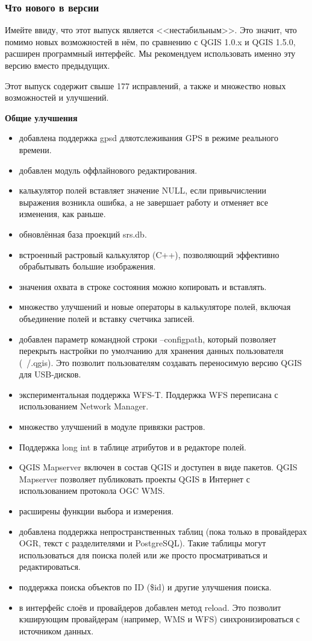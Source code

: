 \subsubsection{Что нового в версии \CURRENT}

Имейте ввиду, что этот выпуск является <<нестабильным>>. Это значит, что
помимо новых возможностей в нём, по сравнению с QGIS 1.0.x и QGIS 1.5.0,
расширен программный интерфейс. Мы рекомендуем использовать именно эту
версию вместо предыдущих.

Этот выпуск содержит свыше 177 исправлений, а также и множество новых
возможностей и улучшений.

\textbf{Общие улучшения}

\begin{itemize}[label=--]
\item добавлена поддержка gpsd дляотслеживания GPS в режиме реального времени.
\item добавлен модуль оффлайнового редактирования.
\item калькулятор полей вставляет значение NULL, если привычислении выражения
возникла ошибка, а не завершает работу и отменяет все изменения, как раньше.
\item обновлённая база проекций srs.db.
\item встроенный растровый калькулятор (C++), позволяющий эффективно обрабытывать
большие изображения.
\item значения охвата в строке состояния можно копировать и вставлять.
\item множество улучшений и новые операторы в калькуляторе полей, включая
объединение полей и вставку счетчика записей.
\item добавлен параметр командной строки --configpath, который позволяет
перекрыть настройки по умолчанию для хранения данных пользователя (~/.qgis).
Это позволит пользователям создавать переносимую версию QGIS для USB-дисков.
\item экспериментальная поддержка WFS-T. Поддержка WFS переписана с
использованием Network Manager.
\item множество улучшений в модуле привязки растров.
\item Поддержка long int в таблице атрибутов и в редакторе полей.
\item QGIS Mapserver включен в состав QGIS и доступен в виде пакетов.
QGIS Mapserver позволяет публиковать проекты QGIS в Интернет с использованием
протокола OGC WMS.
\item расширены функции выбора и измерения.
\item добавлена поддержка непространственных таблиц (пока только в провайдерах
OGR, текст с разделителями и PostgreSQL). Такие таблицы могут использоваться
для поиска полей или же просто просматриваться и редактироваться.
\item поддержка поиска объектов по ID (\$id) и другие улучшения поиска.
\item в интерфейс слоёв и провайдеров добавлен метод reload. Это позволит
кэширующим провайдерам (например, WMS и WFS) синхронизироваться с источником
данных.
\end{itemize}

